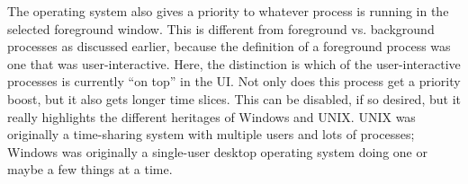 The operating system also gives a priority to whatever process is running in the selected foreground window. This is different from foreground vs. background processes as discussed earlier, because the definition of a foreground process was one that was user-interactive. Here, the distinction is which of the user-interactive processes is currently ``on top'' in the UI. Not only does this process get a priority boost, but it also gets longer time slices. This can be disabled, if so desired, but it really highlights the different heritages of Windows and UNIX. UNIX was originally a time-sharing system with multiple users and lots of processes; Windows was originally a single-user desktop operating system doing one or maybe a few things at a time.




